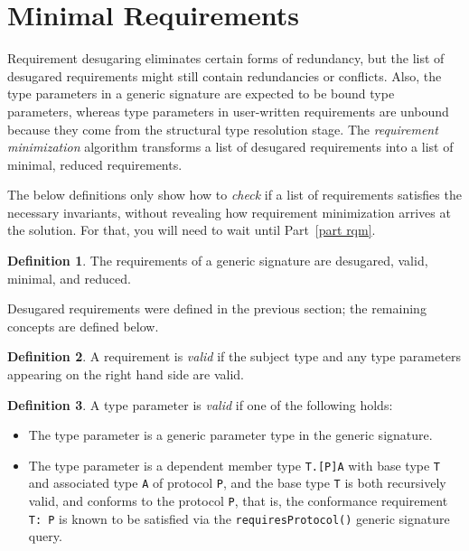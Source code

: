 \documentclass[a4paper,headsepline,bibliography=totoc,toc=flat,fleqn,twoside=semi]{scrbook}
\theoremstyle{definition}
\newtheorem{definition}{Definition}[chapter]
\theoremstyle{definition}
\theoremstyle{definition}
\newcommand{\ifWIP}{\iffalse}
\begin{document}
\section{Minimal Requirements}\label{minimal requirements}

\ifWIP
Requirement desugaring eliminates certain forms of redundancy, but the list of desugared requirements might still contain redundancies or conflicts. Also, the type parameters in a generic signature are expected to be bound type parameters, whereas type parameters in user-written requirements are unbound because they come from the structural type resolution stage. The \emph{requirement minimization} algorithm transforms a list of desugared requirements into a list of minimal, reduced requirements.

The below definitions only show how to \emph{check} if a list of requirements satisfies the necessary invariants, without revealing how requirement minimization arrives at the solution. For that, you will need to wait until Part~\ref{part rqm}.

\begin{definition}\label{generic signature invariants definition} The requirements of a generic signature are desugared, valid, minimal, and reduced.
\end{definition}

Desugared requirements were defined in the previous section; the remaining concepts are defined below.

\begin{definition}
A requirement is \emph{valid} if the subject type and any type parameters appearing on the right hand side are valid.
\end{definition}
\begin{definition} A type parameter is \emph{valid} if one of the following holds:
\begin{itemize}
\item The type parameter is a generic parameter type in the generic signature.
\item The type parameter is a dependent member type \texttt{T.[P]A} with base type \texttt{T} and associated type \texttt{A} of protocol \texttt{P}, and the base type \texttt{T} is both recursively valid, and conforms to the protocol \texttt{P}, that is, the conformance requirement \texttt{T:\ P} is known to be satisfied via the \texttt{requiresProtocol()} generic signature query.
\end{itemize}
\end{definition}
\end{document}
